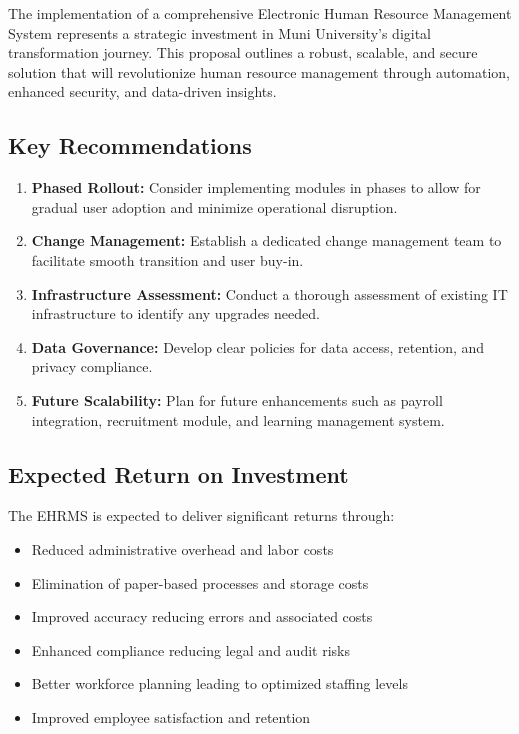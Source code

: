\documentclass[12pt]{article}
\begin{document}
The implementation of a comprehensive Electronic Human Resource Management System represents a strategic investment in Muni University's digital transformation journey. This proposal outlines a robust, scalable, and secure solution that will revolutionize human resource management through automation, enhanced security, and data-driven insights.

\subsection{Key Recommendations}

\begin{enumerate}
\item \textbf{Phased Rollout:} Consider implementing modules in phases to allow for gradual user adoption and minimize operational disruption.
\item \textbf{Change Management:} Establish a dedicated change management team to facilitate smooth transition and user buy-in.
\item \textbf{Infrastructure Assessment:} Conduct a thorough assessment of existing IT infrastructure to identify any upgrades needed.
\item \textbf{Data Governance:} Develop clear policies for data access, retention, and privacy compliance.
\item \textbf{Future Scalability:} Plan for future enhancements such as payroll integration, recruitment module, and learning management system.
\end{enumerate}

\subsection{Expected Return on Investment}

The EHRMS is expected to deliver significant returns through:

\begin{itemize}[noitemsep]
\item Reduced administrative overhead and labor costs
\item Elimination of paper-based processes and storage costs
\item Improved accuracy reducing errors and associated costs
\item Enhanced compliance reducing legal and audit risks
\item Better workforce planning leading to optimized staffing levels
\item Improved employee satisfaction and retention
\end{itemize}
\end{document}
